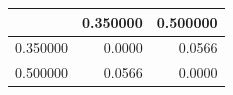 \begin{tabular}{lrr}
\toprule
 & 0.350000 & 0.500000 \\
\midrule
0.350000 & 0.0000 & 0.0566 \\
0.500000 & 0.0566 & 0.0000 \\
\bottomrule
\end{tabular}
